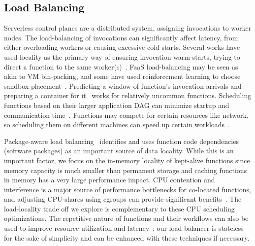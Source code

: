 
\subsection{Load Balancing}

Serverless control planes are a distributed system, assigning invocations to worker nodes.
The load-balancing of invocations can significantly affect latency, from either overloading workers or causing excessive cold starts. 
Several works have used locality as the primary way of ensuring invocation warm-starts, trying to direct a function to the same worker(s)~\cite{package-cristina-19, leegreedy}.
FaaS load-balancing may be seen as akin to VM bin-packing, and some have used reinforcement learning to choose sandbox placement~\cite{balaji2021fireplace}.
Predicting a window of function's invocation arrivals and preparing a container for it~\cite{shahrad2020serverless} works for relatively uncommon functions.
Scheduling functions based on their larger application DAG can minimize startup and communication time~\cite{shen2021defuse, abdi2023palette, guo_decomposing_2022, kotni2021faastlane, shen_defuse_2021,mahgoub_wisefuse_2022,zhou_qos-aware_2022}.
Functions may compete for certain resources like network, so scheduling them on different machines can speed up certain workloads~\cite{tian_owl_2022}.

Package-aware load balancing~\cite{package-cristina-19}  identifies and uses function code dependencies (software packages) as an important source of data locality.
While this is an important factor, we focus on the in-memory locality of kept-alive functions since memory capacity is much smaller than permanent storage and caching functions in memory has a very large performance impact.
%
CPU contention and interference is a major source of performance bottlenecks for co-located functions, and adjusting CPU-shares using cgroups can provide significant benefits~\cite{suresh2019fnsched, suresh2021servermore, ensure-faas-acsos20}.
%
The load-locality trade off we explore is complementary to these CPU scheduling optimizations. 
%
The repetitive nature of functions and their workflows can also be used to improve resource utilization and latency~\cite{hunhoff2020proactive, yu2021faasrank, puru_xanadu_20, przybylski2021data}: our load-balancer is stateless for the sake of simplicity and can be enhanced with these techniques if necessary.


